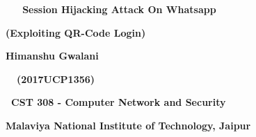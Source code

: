 \documentclass[12pt]{article}
\renewcommand{\_}{\kern-1.5pt\textunderscore\kern-1.5pt}
\begin{document}
\vspace{\baselineskip}
\begin{Center}
{\fontsize{18pt}{21.6pt}\selectfont \textbf{\ \ \  Session Hijacking Attack On Whatsapp}\par}
\end{Center}\par

\begin{adjustwidth}{2.0in}{0.0in}
\begin{Center}
{\fontsize{18pt}{21.6pt}\selectfont \textbf{(Exploiting QR-Code Login)\tab \tab \tab \tab }\par}
\end{Center}\par

\end{adjustwidth}

\begin{FlushLeft}
{\fontsize{16pt}{19.2pt}\selectfont \textbf{ \tab \tab \tab \tab Himanshu Gwalani}\par}
\end{FlushLeft}\par

\begin{adjustwidth}{2.0in}{0.0in}
\begin{FlushLeft}
{\fontsize{16pt}{19.2pt}\selectfont \textbf{\ \  (2017UCP1356)}\par}
\end{FlushLeft}\par

\end{adjustwidth}


\vspace{\baselineskip}
\begin{adjustwidth}{1.0in}{0.0in}
\begin{FlushLeft}
{\fontsize{14pt}{16.8pt}\selectfont \textbf{\  CST 308 - Computer Network and Security}\par}
\end{FlushLeft}\par

\end{adjustwidth}

\begin{Center}
{\fontsize{14pt}{16.8pt}\selectfont \textbf{Malaviya National Institute of Technology, Jaipur}\par}
\end{Center}\par
\end{document}
